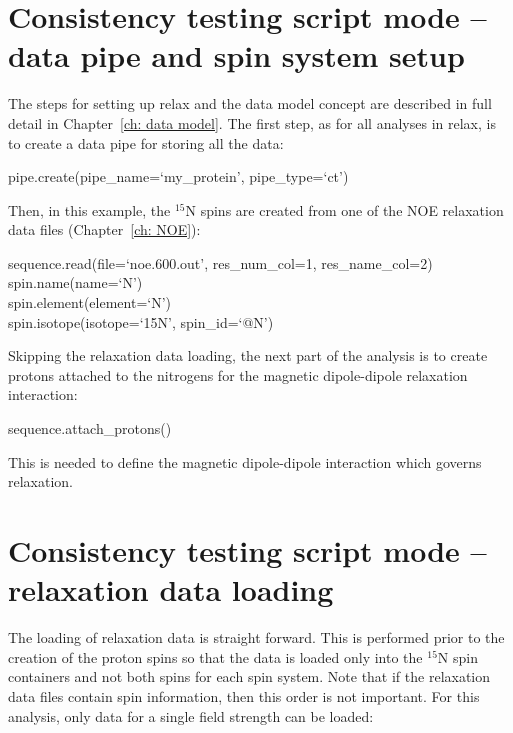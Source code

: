 
\section{Consistency testing script mode -- data pipe and spin system setup}

The steps for setting up relax and the data model concept are described in full detail in Chapter~\ref{ch: data model}.  The first step, as for all analyses in relax, is to create a data pipe for storing all the data:

\begin{exampleenv}
pipe.create(pipe\_name=`my\_protein', pipe\_type=`ct')
\end{exampleenv}

Then, in this example, the $^{15}$N spins are created from one of the NOE relaxation data files (Chapter~\ref{ch: NOE}):

\begin{exampleenv}
sequence.read(file=`noe.600.out', res\_num\_col=1, res\_name\_col=2) \\
spin.name(name=`N') \\
spin.element(element=`N') \\
spin.isotope(isotope=`15N', spin\_id=`@N')
\end{exampleenv}

Skipping the relaxation data loading, the next part of the analysis is to create protons attached to the nitrogens for the magnetic dipole-dipole relaxation interaction:

\begin{exampleenv}
sequence.attach\_protons()
\end{exampleenv}

This is needed to define the magnetic dipole-dipole interaction which governs relaxation.




\section{Consistency testing script mode -- relaxation data loading}

The loading of relaxation data is straight forward.  This is performed prior to the creation of the proton spins so that the data is loaded only into the $^{15}$N spin containers and not both spins for each spin system.  Note that if the relaxation data files contain spin information, then this order is not important.  For this analysis, only data for a single field strength can be loaded:

